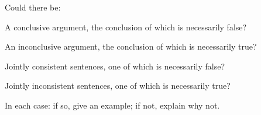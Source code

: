 \problempart
\label{pr.ModalityValidity}
Could there be:
\begin{earg}
\item A conclusive argument, the conclusion of which is necessarily false?
\item An inconclusive argument, the conclusion of which is necessarily true?
\item Jointly consistent sentences, one of which is necessarily false?
\item Jointly inconsistent sentences, one of which is necessarily true?
\end{earg}
In each case: if so, give an example; if not, explain why not.